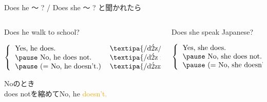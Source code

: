 \documentclass[aspectratio=169]{beamer}
\newcommand{\myaudio}[1]{\href{#1}{\faVolumeUp}}
\begin{document}
\begin{frame}[plain]{Does he  〜 ? / Does she 〜 ? と聞かれたら}
 \Large


\begin{columns}[t]
\begin{column}{.55\textwidth}
Does he walk to school?

\vspace{20pt}

\pause

\mbox{}\hspace{0pt}$\left\{\begin{tabular}{ll}
         \text{Yes, he does.}&\text{\textipa{/d\'2z/}}\\\pause
         \text{No, he does not.}&\text{\textipa{/d\'2z n\'At/}}\\\pause
         \text{(}= \text{No, he doesn't.)}&\text{\textipa{/d\'2znt/}}\\
       \end{tabular}\right.$

\pause

\vspace{10pt}

{\small Noのとき\\[-5pt]does notを縮めてNo, he \textcolor{orange}{doesn't.}}

\end{column}
\pause
\begin{column}{.435\textwidth}
Does she speak Japanese?

\vspace{5pt}

\pause

\mbox{}\hspace{40pt}$\left\{\begin{tabular}{l}
         \text{Yes, she does.}\\\pause
         \text{No, she does not.}\\\pause
           \text{(}= \text{No, she doesn't.)}
       \end{tabular}\right.$


\pause

\vspace{20pt}
\mbox{}\hfill\myaudio{./audio/011_answer_do_02.mp3}\,\,{}

\end{column}
\end{columns}

\end{frame}
\end{document}
